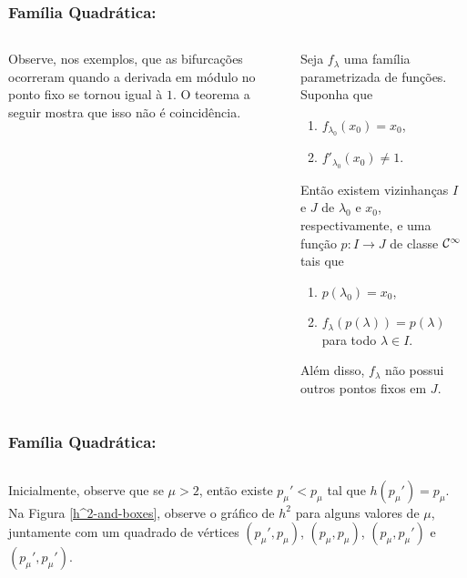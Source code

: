 
\begin{frame}
\vspace{5pt}
\frametitle{Família Quadrática: \subsecname}
\begin{columns}
\column{\dimexpr\paperwidth-15pt}

Observe, nos exemplos, que as bifurcações ocorreram quando a derivada em módulo no ponto fixo se tornou igual à $1$. O teorema a seguir mostra que isso não é coincidência.

\begin{theorem}
Seja $f_\lambda$ uma família parametrizada de funções.
Suponha que
\begin{enumerate}
\item $f_{\lambda_0}(x_0) = x_0$,
\item $f'_{\lambda_0}(x_0) \neq 1$. 
\end{enumerate}
Então existem vizinhanças $I$ e $J$ de $\lambda_0$ e $x_0$, respectivamente, e uma função $p: I \to J$ de classe $\mathcal{C}^\infty$ tais que
\begin{enumerate}
\item $p(\lambda_0) = x_0$, 
\item $f_\lambda(p(\lambda)) = p(\lambda)$ para todo $\lambda \in I$.
\end{enumerate}
Além disso, $f_\lambda$ não possui outros pontos fixos em $J$.
\end{theorem}

\end{columns}
\end{frame}


\begin{frame}
\vspace{5pt}
\frametitle{Família Quadrática: \subsecname}
\begin{columns}
\column{\dimexpr\paperwidth-15pt}

Inicialmente, observe que se $\mu > 2$, então existe $p_\mu' < p_\mu$ tal que $h(p_\mu') = p_\mu$.
Na Figura \ref{h^2-and-boxes}, observe o gráfico de $h^2$ para alguns valores de $\mu$, juntamente com um quadrado de vértices $(p_\mu', p_\mu)$, $(p_\mu, p_\mu)$, $(p_\mu, p_\mu')$ e $(p_\mu', p_\mu')$.

\end{columns}
\end{frame}


